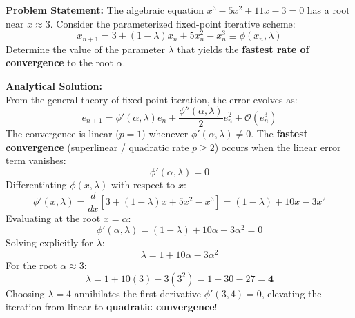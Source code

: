 \begin{examplebox}
\textbf{Problem Statement:} The algebraic equation $x^3 - 5x^2 + 11x - 3 = 0$ has a root near $x \approx 3$. Consider the parameterized fixed-point iterative scheme:
\begin{equation}
    x_{n+1} = 3 + (1 - \lambda)x_n + 5x_n^2 - x_n^3 \equiv \phi(x_n, \lambda)
\end{equation}
Determine the value of the parameter $\lambda$ that yields the \textbf{fastest rate of convergence} to the root $\alpha$.

\medskip
\noindent\textbf{Analytical Solution:} \\
From the general theory of fixed-point iteration, the error evolves as:
\begin{equation}
    e_{n+1} = \phi'(\alpha, \lambda) e_n + \frac{\phi''(\alpha, \lambda)}{2} e_n^2 + \mathcal{O}(e_n^3)
\end{equation}
The convergence is linear ($p = 1$) whenever $\phi'(\alpha, \lambda) \ne 0$. The \textbf{fastest convergence} (superlinear / quadratic rate $p \ge 2$) occurs when the linear error term vanishes:
\begin{equation}
    \boxed{\phi'(\alpha, \lambda) = 0}
\end{equation}
Differentiating $\phi(x, \lambda)$ with respect to $x$:
\begin{equation}
    \phi'(x, \lambda) = \frac{d}{dx}\left[ 3 + (1 - \lambda)x + 5x^2 - x^3 \right] = (1 - \lambda) + 10x - 3x^2
\end{equation}
Evaluating at the root $x = \alpha$:
\begin{equation}
    \phi'(\alpha, \lambda) = (1 - \lambda) + 10\alpha - 3\alpha^2 = 0
\end{equation}
Solving explicitly for $\lambda$:
\begin{equation}
    \boxed{\lambda = 1 + 10\alpha - 3\alpha^2}
\end{equation}
For the root $\alpha \approx 3$:
\begin{equation}
    \lambda = 1 + 10(3) - 3(3^2) = 1 + 30 - 27 = \mathbf{4}
\end{equation}
Choosing $\lambda = 4$ annihilates the first derivative $\phi'(3, 4) = 0$, elevating the iteration from linear to \textbf{quadratic convergence}!
\end{examplebox}

